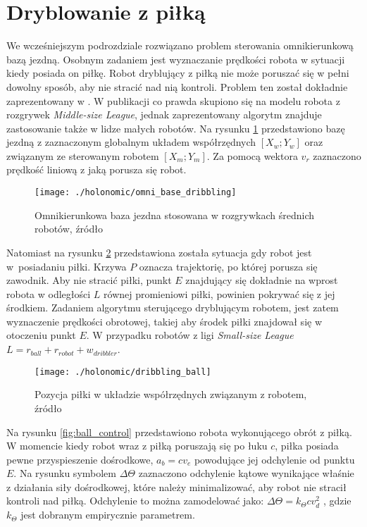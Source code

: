 \section{Dryblowanie z piłką \label{sec:dribbling_with_ball}}
We wcześniejszym podrozdziale rozwiązano problem sterowania omnikierunkową bazą jezdną. Osobnym zadaniem jest wyznaczanie prędkości robota w sytuacji kiedy posiada on piłkę.
Robot dryblujący z piłką nie może poruszać się w pełni dowolny sposób, aby nie stracić nad nią kontroli. Problem ten został dokładnie zaprezentowany w \cite{dribbling}. W publikacji co prawda skupiono
się na modelu robota z rozgrywek \emph{Middle-size League}, jednak zaprezentowany algorytm znajduje zastosowanie także w lidze małych robotów.
Na rysunku \ref{fig:omni_base_dribbling} przedstawiono bazę jezdną z zaznaczonym globalnym układem współrzędnych $[X_w;Y_w]$ oraz związanym ze sterowanym robotem $[X_m;Y_m]$. Za pomocą wektora $v_r$ zaznaczono
prędkość liniową z jaką porusza się robot.
\begin{figure}[h]
\centering
\texttt{[image: ./holonomic/omni\_base\_dribbling]}
\caption{Omnikierunkowa baza jezdna stosowana w rozgrywkach średnich robotów, źródło \cite{dribbling}}\label{fig:omni_base_dribbling}
\end{figure}
Natomiast na rysunku \ref{fig:dribbling_ball} przedstawiona została sytuacja gdy robot jest w~posiadaniu piłki. Krzywa $P$ oznacza trajektorię, po której porusza się zawodnik. Aby nie stracić piłki,
punkt $E$ znajdujący się dokładnie na wprost robota w odległości $L$ równej promieniowi piłki, powinien pokrywać się z jej środkiem. Zadaniem algorytmu sterującego dryblującym robotem, jest zatem wyznaczenie
prędkości obrotowej, takiej aby środek piłki znajdował się w otoczeniu punkt $E$. W przypadku robotów z ligi \emph{Small-size League} $L=r_{ball}+r_{robot} +w_{dribbler}$.
\begin{figure}[h]
\centering
\texttt{[image: ./holonomic/dribbling\_ball]}
\caption{ Pozycja piłki w układzie współrzędnych związanym z robotem, źródło \cite{dribbling} }\label{fig:dribbling_ball}
\end{figure}
Na rysunku \ref{fig:ball_control} przedstawiono robota wykonującego obrót z piłką. W momencie kiedy robot wraz z piłką poruszają się po łuku $c$, piłka posiada pewne przyspieszenie dośrodkowe,
$a_b=cv_e$ powodujące jej odchylenie od punktu $E$. Na rysunku symbolem $\Delta\Theta$ zaznaczono odchylenie kątowe wynikające właśnie z działania siły dośrodkowej, które należy minimalizować,
 aby robot nie stracił kontroli nad piłką. Odchylenie to można zamodelować jako: $\Delta\Theta=k_{\Theta}cv_{d}^2$ , gdzie $k_{\Theta}$ jest dobranym empirycznie parametrem.
